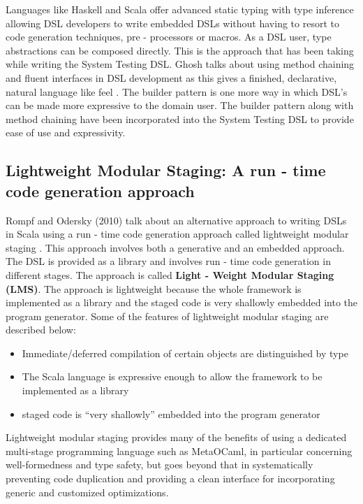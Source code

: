 \documentclass[12 pt]{article}
\begin{document}
\noindent
Languages like Haskell and Scala offer advanced static typing with type inference allowing DSL developers to write embedded DSLs without having to resort to code generation techniques, pre - processors or macros. As a DSL user, type abstractions can be composed directly. This is the approach that has been taking while writing the System Testing DSL. Ghosh talks about using method chaining and fluent interfaces in DSL development as this gives a finished, declarative, natural language like feel \cite{fluentInterface}. The builder pattern is one more way in which DSL's can be made more expressive to the domain user. The builder pattern along with method chaining have been incorporated into the System Testing DSL to provide ease of use and expressivity.

\subsection{Lightweight Modular Staging: A run - time code generation approach}
Rompf and Odersky (2010) talk about an alternative approach to writing DSLs in Scala using a run - time code generation approach called lightweight modular staging \cite{lms}. This approach involves both a generative and an embedded approach. The DSL is provided as a library and involves run - time code generation in different stages. The approach is called \textbf{Light - Weight Modular Staging (LMS)}. The approach is lightweight because the whole framework is implemented as a library and the staged code is very shallowly embedded into the program generator. Some of the features of lightweight modular staging are described below:
\begin{itemize}
\item Immediate/deferred compilation of certain objects are distinguished by type
\item The Scala language is expressive enough to allow the framework to be implemented as a library
\item staged code is “very shallowly” embedded into the program generator
\end{itemize}
\bigskip

\noindent
Lightweight modular staging provides many of the benefits of using a dedicated multi-stage programming language such as MetaOCaml, in particular concerning well-formedness and type safety, but goes beyond that in systematically preventing code duplication and providing a clean interface for incorporating generic and customized optimizations.
\end{document}
